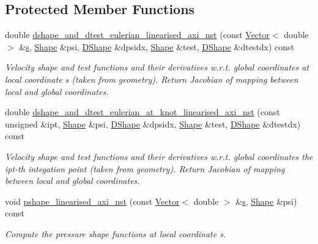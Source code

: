 \subsection*{Protected Member Functions}
\begin{DoxyCompactItemize}
\item 
double \hyperlink{classoomph_1_1LinearisedAxisymmetricQTaylorHoodElement_ad659c48a698966a356977f6576ad844c}{dshape\+\_\+and\+\_\+dtest\+\_\+eulerian\+\_\+linearised\+\_\+axi\+\_\+nst} (const \hyperlink{classoomph_1_1Vector}{Vector}$<$ double $>$ \&\hyperlink{cfortran_8h_ab7123126e4885ef647dd9c6e3807a21c}{s}, \hyperlink{classoomph_1_1Shape}{Shape} \&psi, \hyperlink{classoomph_1_1DShape}{D\+Shape} \&dpsidx, \hyperlink{classoomph_1_1Shape}{Shape} \&test, \hyperlink{classoomph_1_1DShape}{D\+Shape} \&dtestdx) const
\begin{DoxyCompactList}\small\item\em Velocity shape and test functions and their derivatives w.\+r.\+t. global coordinates at local coordinate s (taken from geometry). Return Jacobian of mapping between local and global coordinates. \end{DoxyCompactList}\item 
double \hyperlink{classoomph_1_1LinearisedAxisymmetricQTaylorHoodElement_a2062342b02d9d638070107ee3f1e5a70}{dshape\+\_\+and\+\_\+dtest\+\_\+eulerian\+\_\+at\+\_\+knot\+\_\+linearised\+\_\+axi\+\_\+nst} (const unsigned \&ipt, \hyperlink{classoomph_1_1Shape}{Shape} \&psi, \hyperlink{classoomph_1_1DShape}{D\+Shape} \&dpsidx, \hyperlink{classoomph_1_1Shape}{Shape} \&test, \hyperlink{classoomph_1_1DShape}{D\+Shape} \&dtestdx) const
\begin{DoxyCompactList}\small\item\em Velocity shape and test functions and their derivatives w.\+r.\+t. global coordinates the ipt-\/th integation point (taken from geometry). Return Jacobian of mapping between local and global coordinates. \end{DoxyCompactList}\item 
void \hyperlink{classoomph_1_1LinearisedAxisymmetricQTaylorHoodElement_a48fa05d60b707ef51decf0fb829ed8ee}{pshape\+\_\+linearised\+\_\+axi\+\_\+nst} (const \hyperlink{classoomph_1_1Vector}{Vector}$<$ double $>$ \&\hyperlink{cfortran_8h_ab7123126e4885ef647dd9c6e3807a21c}{s}, \hyperlink{classoomph_1_1Shape}{Shape} \&psi) const
\begin{DoxyCompactList}\small\item\em Compute the pressure shape functions at local coordinate s. \end{DoxyCompactList}\item 

\end{DoxyCompactItemize}
